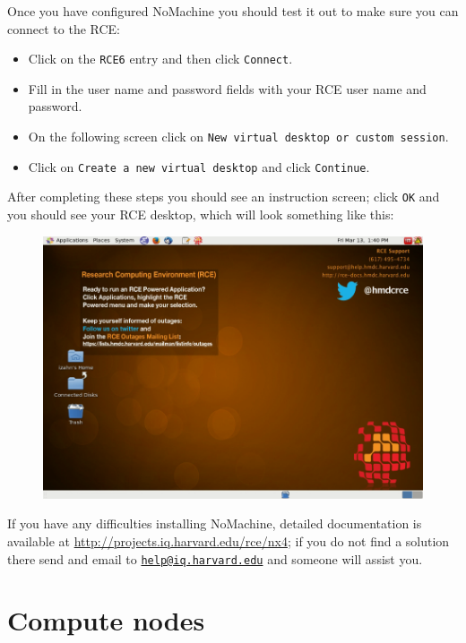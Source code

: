 \documentclass[]{book}
\providecommand{\tightlist}{%
  \setlength{\itemsep}{0pt}\setlength{\parskip}{0pt}}
\begin{document}
Once you have configured NoMachine you should test it out to make sure
you can connect to the RCE:

\begin{itemize}
\tightlist
\item
  Click on the \texttt{RCE6} entry and then click \texttt{Connect}.
\item
  Fill in the user name and password fields with your RCE user name and
  password.
\item
  On the following screen click on
  \texttt{New\ virtual\ desktop\ or\ custom\ session}.
\item
  Click on \texttt{Create\ a\ new\ virtual\ desktop} and click
  \texttt{Continue}.
\end{itemize}

After completing these steps you should see an instruction screen; click
\texttt{OK} and you should see your RCE desktop, which will look
something like this:

\begin{figure}
\centering
\includegraphics{images/rceDesktop.png}
\caption{}
\end{figure}

If you have any difficulties installing NoMachine, detailed
documentation is available at
\url{http://projects.iq.harvard.edu/rce/nx4}; if you do not find a
solution there send and email to
\href{mailto:help@iq.harvard.edu}{\nolinkurl{help@iq.harvard.edu}} and
someone will assist you.

\section{Compute nodes}\label{compute-nodes}
\end{document}
